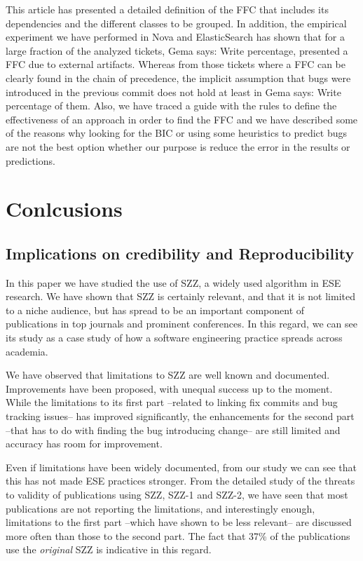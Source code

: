 \documentclass[a4paper, 12pt]{book}
\begin{document}
This article has presented a detailed definition of the FFC that includes its dependencies and the different classes to be grouped. In addition, the empirical experiment we have performed in Nova and ElasticSearch has shown that for a large fraction of the analyzed tickets, Gema says: Write percentage, presented a FFC due to external artifacts. Whereas from those tickets where a FFC can be clearly found in the chain of precedence, the implicit assumption that bugs were introduced in the previous commit does not hold at least in Gema says: Write percentage of them.
Also, we have traced a guide with the rules to define the effectiveness of an approach in order to find the FFC and we have described some of the reasons why looking for the BIC or using some heuristics to predict bugs are not the best option whether our purpose is reduce the error in the results or predictions.

\section{Conlcusions}
\subsection{Implications on credibility and Reproducibility}
\label{subsec:implications}
In this paper we have studied the use of SZZ, a widely used algorithm in ESE research. We have shown that SZZ is certainly relevant, and that it is not limited to a niche audience, but has spread to be an important component of publications in top journals and prominent conferences. In this regard, we can see its study as a case study of how a software engineering practice spreads across academia.

We have observed that limitations to SZZ are well known and documented. Improvements have been proposed, with unequal success up to the moment. While the limitations to its first part --related to linking fix commits and bug tracking issues-- has improved significantly, the enhancements for the second part --that has to do with finding the bug introducing change-- are still limited and accuracy has room for improvement.

Even if limitations have been widely documented, from our study we can see that this has not made ESE practices stronger. From the detailed study of the threats to validity of publications using SZZ, SZZ-1 and SZZ-2, we have seen that most publications are not reporting the limitations, and interestingly enough, limitations to the first part --which have shown to be less relevant-- are discussed more often than those to the second part. The fact that 37\% of the publications use the \emph{original} SZZ is indicative in this regard.
\end{document}
